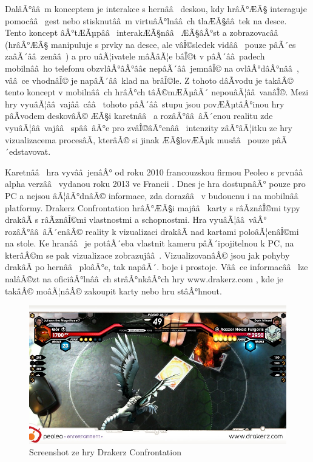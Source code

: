 \documentclass[twoside,12pt]{article}
\begin{document}
DalâÂ°ââ m konceptem je interakce s hernââ  deskou, kdy hrâÂ°ÆÃ§ interaguje pomocââ  gest nebo stisknutââ m virtuâÂ°lnââ ch tlaÆÃ§ââ tek na desce. Tento koncept âÂ°tÆÃµpââ  interakÆÃ§nââ  ÆÃ§âÂ°st a zobrazovacââ  (hrâÂ°ÆÃ§ manipuluje s prvky na desce, ale vâÎ©sledek vidââ  pouze pâÃ´es zaâÃ´ââ zenââ ) a pro uâÃ¦ivatele mâÃâÃ¦e bâÎ©t v pâÃ´ââ padech mobilnââ ho telefonu obzvlâÂ°âÂ°ââ¢ nepâÃ´ââ jemnâÎ© na ovlâÂ°dâÂ°nââ , vââ ce vhodnâÎ© je napâÃ´ââ klad na brâÎ©le. Z tohoto dâÃvodu je takâÂ© tento koncept v mobilnââ ch hrâÂ°ch tâÂ©mÆÃµâÃ´ nepouâÃ¦ââ vanâÎ©. Mezi hry vyuâÃ¦ââ vajââ cââ  tohoto pâÃ´ââ stupu jsou povÆÃµtâÂ°inou hry pâÃvodem deskovâÂ© ÆÃ§i karetnââ  a rozâÂ°ââ âÃ´enou realitu zde vyuâÃ¦ââ vajââ  spââ âÂ°e pro zvâÎ©âÂ°enââ  intenzity zâÂ°âÃ¦itku ze hry vizualizacema procesâÃ, kterâÂ© si jinak ÆÃ§lovÆÃµk musââ  pouze pâÃ´edstavovat. 

%
%

Karetnââ  hra vyvââ jenâÂ° od roku 2010 francouzskou firmou Peoleo s prvnââ  alpha verzââ  vydanou roku 2013 ve Francii \cite{venturebeat}. Dnes je hra dostupnâÂ° pouze pro PC a nejsou âÃ¦âÂ°dnâÂ© informace, zda dorazââ  v budoucnu i na mobilnââ  platformy. Drakerz Confrontation hrâÂ°ÆÃ§i majââ  karty s râÃznâÎ©mi typy drakâÃ s râÃznâÎ©mi vlastnostmi a schopnostmi. Hra vyuâÃ¦ââ vâÂ° rozâÂ°ââ âÃ´enâÂ© reality k vizualizaci drakâÃ nad kartami poloâÃ¦enâÎ©mi na stole. Ke hranââ  je potâÃ´eba vlastnit kameru pâÃ´ipojitelnou k PC, na kterâÂ©m se pak vizualizace zobrazujââ . VizualizovanâÂ© jsou jak pohyby drakâÃ po hernââ  ploâÂ°e, tak napâÃ´. boje i prostoje. Vââ ce informacââ  lze nalâÂ©zt na oficiâÂ°lnââ ch strâÂ°nkâÂ°ch hry www.drakerz.com \cite{peoleo_about}, kde je takâÂ© moâÃ¦nâÂ© zakoupit karty nebo hru stâÂ°hnout.


\begin{figure}[H]
    \includegraphics[width=424px, center]{images/drakerz-confrontation.jpg}
    \caption{Screenshot ze hry Drakerz Confrontation}
    \label{drakerz_screenshot}
\end{figure}
\end{document}

